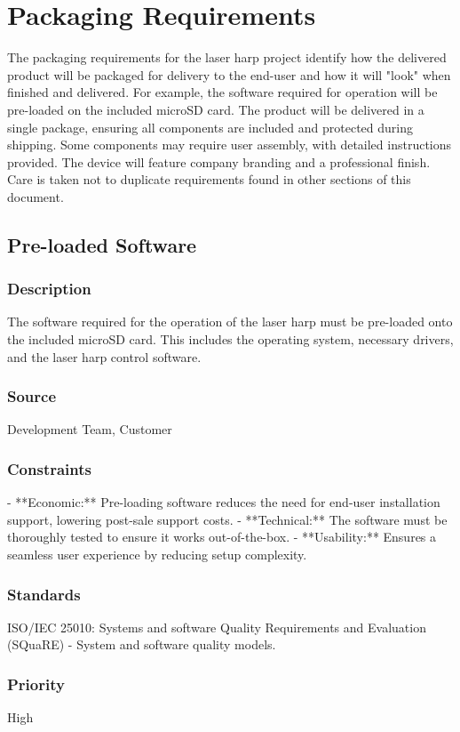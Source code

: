 \section{Packaging Requirements}

The packaging requirements for the laser harp project identify how the delivered product will be packaged for delivery to the end-user and how it will "look" when finished and delivered. For example, the software required for operation will be pre-loaded on the included microSD card. The product will be delivered in a single package, ensuring all components are included and protected during shipping. Some components may require user assembly, with detailed instructions provided. The device will feature company branding and a professional finish. Care is taken not to duplicate requirements found in other sections of this document.


\subsection{Pre-loaded Software}
\subsubsection{Description}
The software required for the operation of the laser harp must be pre-loaded onto the included microSD card. This includes the operating system, necessary drivers, and the laser harp control software.
\subsubsection{Source}
Development Team, Customer
\subsubsection{Constraints}
- **Economic:** Pre-loading software reduces the need for end-user installation support, lowering post-sale support costs.
- **Technical:** The software must be thoroughly tested to ensure it works out-of-the-box.
- **Usability:** Ensures a seamless user experience by reducing setup complexity.
\subsubsection{Standards}
ISO/IEC 25010: Systems and software Quality Requirements and Evaluation (SQuaRE) - System and software quality models.
\subsubsection{Priority}
High


